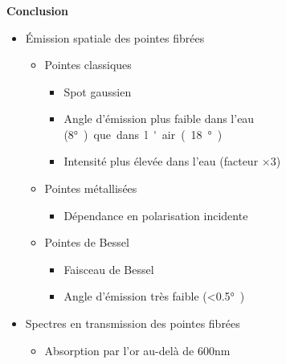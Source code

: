\documentclass[9pt,a9paper,handout]{beamer}
\begin{document}
\begin{frame}
    \frametitle{}
    {\large \textbf{Conclusion}} \vspace*{1mm}
    \begin{itemize}
        \item Émission spatiale des pointes fibrées
            \begin{itemize}
                \item Pointes classiques
                    \begin{itemize}
                        \item {\small Spot gaussien}
                        \vspace*{.5mm}
                        \item {\small Angle d'émission plus faible dans l'eau (8\si\degree) que dans l'air (18\si\degree)}
                        \vspace*{.5mm}
                        \item {\small Intensité plus élevée dans l'eau (facteur $\times 3$)}
                    \end{itemize}
        \vspace*{1mm}
                \item Pointes métallisées
                    \begin{itemize}
                        \item {\small Dépendance en polarisation incidente}
                    \end{itemize}
        \vspace*{1mm}
                \item Pointes de Bessel
                    \begin{itemize}
                        \item {\small Faisceau de Bessel}
                        \vspace*{.5mm}
                        \item {\small Angle d'émission très faible (<0.5\si\degree)}
                    \end{itemize}
            \end{itemize}
            
        \vspace*{2mm}
        \item Spectres en transmission des pointes fibrées
            \begin{itemize}
                \item Absorption par l'or au-delà de 600nm
            \end{itemize}
        

\end{itemize}
\end{frame}
\end{document}
